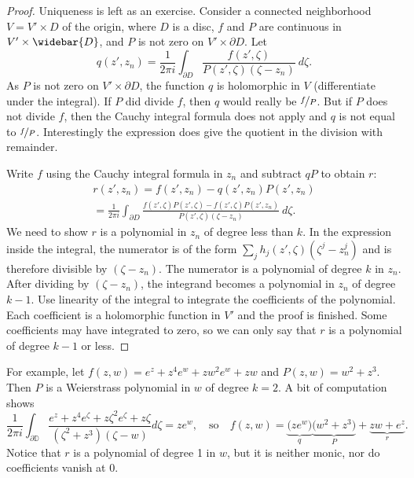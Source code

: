 \documentclass[12pt,openany]{book}
\newcommand{\D}{{\mathbb{D}}}
\theoremstyle{plain}
\theoremstyle{remark}
\theoremstyle{definition}
\theoremstyle{exercise}
\theoremstyle{example}
\begin{document}
\begin{proof}
Uniqueness is left as an exercise.  Consider
a connected neighborhood $V = V' \times D$ of the origin, where
$D$ is a disc,
$f$ and $P$ are continuous in $V' \times \widebar{D}$,
and 
$P$ is not zero on $V' \times \partial D$.
Let
\begin{equation*}
q(z',z_n) =
\frac{1}{2\pi i} \int_{\partial D} \frac{f(z',\zeta)}{P(z',\zeta)(\zeta-z_n)}
~d\zeta .
\end{equation*}
As $P$ is not zero on $V' \times \partial D$,
the function $q$ 
is holomorphic in $V$ (differentiate under the integral).
If $P$ did divide $f$, then $q$ would really be $\nicefrac{f}{P}$.
But if $P$ does not divide $f$, then
the Cauchy integral formula does not apply and $q$ is not equal to
$\nicefrac{f}{P}$.  Interestingly
the expression does give the quotient in the division with remainder.

Write $f$ using the Cauchy integral formula in $z_n$ and
subtract $qP$ to obtain $r$:
\begin{multline*}
r(z',z_n) = f(z',z_n) - q(z',z_n)P(z',z_n)
\\
=
\frac{1}{2\pi i}
\int_{\partial D} \frac{f(z',\zeta)P(z',\zeta) - f(z',\zeta)P(z',z_n)}{P(z',\zeta)(\zeta-z_n)}
~d\zeta .
\end{multline*}
We need to show $r$ is a polynomial in $z_n$ of degree less than
$k$.  In the expression inside the integral, the numerator is
of the form $\sum_j h_j(z',\zeta)(\zeta^j-z_n^j)$ and is therefore
divisible by $(\zeta-z_n)$.
The numerator is a polynomial of degree $k$ in
$z_n$.  After dividing by $(\zeta-z_n)$,
the integrand becomes
a polynomial in $z_n$ of degree $k-1$. 
Use linearity of the integral
to integrate the coefficients of the polynomial.  Each coefficient is a
holomorphic function in $V'$ and the proof is finished.  Some coefficients may have
integrated to zero, so we can only say that $r$ is a polynomial
of degree $k-1$ or less.
\end{proof}

For example, let $f(z,w) = e^z + z^4 e^w + z w^2 e^w + zw$ and $P(z,w)
= w^2 + z^3$.  Then $P$ is a Weierstrass polynomial in $w$ of degree $k=2$.  A bit
of computation shows
\begin{equation*}
\frac{1}{2\pi i}
\int_{\partial \D}
\frac{e^z + z^4 e^{\zeta} + z {\zeta}^2 e^{\zeta} + z \zeta}{(\zeta^2+z^3)(\zeta-w)}
d\zeta
=
z e^w
,
\quad \text{so} \quad
f(z,w) = \underbrace{\bigl( ze^w \bigr)}_{q} \underbrace{\bigl( w^2 + z^3 \bigr)}_{P} +
\underbrace{z w + e^z}_{r} .
\end{equation*}
Notice that $r$ is a polynomial of degree 1 in $w$, but it is neither monic,
nor do coefficients vanish at 0.
\end{document}
